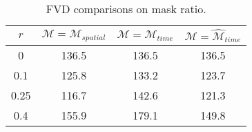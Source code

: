 \begin{table}[h]
    \centering
    \begin{tabular}{c|ccc}
    \toprule
    $r$ & $\mathcal{M}=\mathcal{M}_{spatial}$ & $\mathcal{M}=\mathcal{M}_{time}$ & $\mathcal{M}=\mathcal{\hat{M}}_{time}$\\
    \midrule
     0 & 136.5 & 136.5 & 136.5 \\
     0.1 & 125.8 & 133.2 & 123.7 \\
     0.25 & 116.7 & 142.6 & 121.3 \\
     0.4 & 155.9 & 179.1 & 149.8 \\

    \bottomrule
    \end{tabular}

    \caption{FVD comparisons on mask ratio. }
    \label{tab:supp_abl_mr}
\end{table}